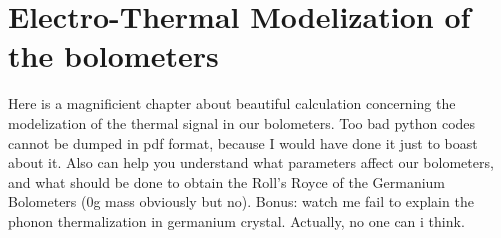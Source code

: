 
\chapter{Electro-Thermal Modelization of the bolometers} %

\label{ChapterEthem} %


Here is a magnificient chapter about beautiful calculation concerning the modelization of the thermal signal in our bolometers. Too bad python codes cannot be dumped in pdf format, because I would have done it just to boast about it.
Also can help you understand what parameters affect our bolometers, and what should be done to obtain the Roll's Royce of the Germanium Bolometers (0g mass obviously but no).
Bonus: watch me fail to explain the phonon thermalization in germanium crystal. Actually, no one can i think.